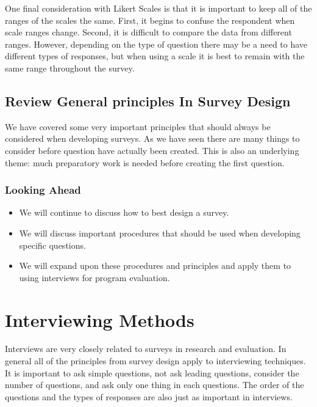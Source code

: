 \documentclass[]{book}
\theoremstyle{definition}
\theoremstyle{definition}
\theoremstyle{definition}
\theoremstyle{remark}
\begin{document}
One final consideration with Likert Scales is that it is important to
keep all of the ranges of the scales the same. First, it begins to
confuse the respondent when scale ranges change. Second, it is difficult
to compare the data from different ranges. However, depending on the
type of question there may be a need to have different types of
responses, but when using a scale it is best to remain with the same
range throughout the survey.

\hypertarget{review-general-principles-in-survey-design}{%
\section{Review General principles In Survey
Design}\label{review-general-principles-in-survey-design}}

We have covered some very important principles that should always be
considered when developing surveys. As we have seen there are many
things to consider before question have actually been created. This is
also an underlying theme: much preparatory work is needed before
creating the first question.

\hypertarget{looking-ahead-7}{%
\subsection{Looking Ahead}\label{looking-ahead-7}}

\begin{itemize}
\item
  We will continue to discuss how to best design a survey.
\item
  We will discuss important procedures that should be used when
  developing specific questions.
\item
  We will expand upon these procedures and principles and apply them to
  using interviews for program evaluation.
\end{itemize}

\hypertarget{interviewing-methods}{%
\chapter{Interviewing Methods}\label{interviewing-methods}}

Interviews are very closely related to surveys in research and
evaluation. In general all of the principles from survey design apply to
interviewing techniques. It is important to ask simple questions, not
ask leading questions, consider the number of questions, and ask only
one thing in each questions. The order of the questions and the types of
responses are also just as important in interviews.
\end{document}

